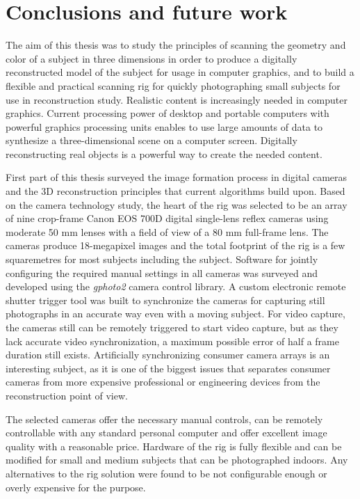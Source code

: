 \section{Conclusions and future work} \label{sec:conclusion}
The aim of this thesis was to study the principles of scanning the geometry and color of a subject in three dimensions in order to produce a digitally reconstructed model of the subject for usage in computer graphics, and to build a flexible and practical scanning rig for quickly photographing small subjects for use in reconstruction study.
Realistic content is increasingly needed in computer graphics.
Current processing power of desktop and portable computers with powerful graphics processing units enables to use large amounts of data to synthesize a three-dimensional scene on a computer screen.
Digitally reconstructing real objects is a powerful way to create the needed content.

First part of this thesis surveyed the image formation process in digital cameras and the 3D reconstruction principles that current algorithms build upon.
Based on the camera technology study, the heart of the rig was selected to be an array of nine crop-frame Canon EOS 700D digital single-lens reflex cameras using moderate 50 mm lenses with a field of view of a 80 mm full-frame lens.
The cameras produce 18-megapixel images and the total footprint of the rig is a few squaremetres for most subjects including the subject.
Software for jointly configuring the required manual settings in all cameras was surveyed and developed using the \emph{gphoto2} camera control library.
A custom electronic remote shutter trigger tool was built to synchronize the cameras for capturing still photographs in an accurate way even with a moving subject.
For video capture, the cameras still can be remotely triggered to start video capture, but as they lack accurate video synchronization, a maximum possible error of half a frame duration still exists.
Artificially synchronizing consumer camera arrays is an interesting subject, as it is one of the biggest issues that separates consumer cameras from more expensive professional or engineering devices from the reconstruction point of view.

The selected cameras offer the necessary manual controls, can be remotely controllable with any standard personal computer and offer excellent image quality with a reasonable price.
Hardware of the rig is fully flexible and can be modified for small and medium subjects that can be photographed indoors.
Any alternatives to the rig solution were found to be not configurable enough or overly expensive for the purpose.

